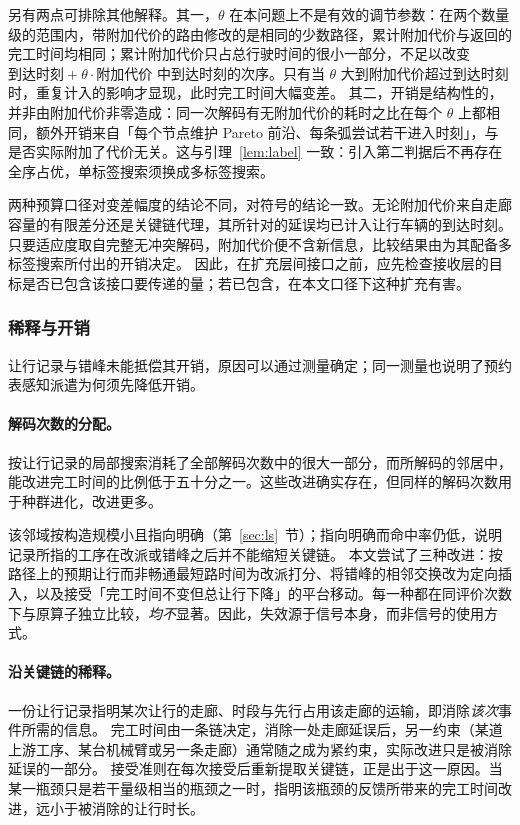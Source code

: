 \documentclass[manuscript,screen,review]{acmart}
\begin{document}
另有两点可排除其他解释。其一，$\theta$ 在本问题上不是有效的调节参数：在两个数量级的范围内，带附加代价的路由修改的是相同的少数路径，累计附加代价与返回的完工时间均相同；累计附加代价只占总行驶时间的很小一部分，不足以改变 $\text{到达时刻}+\theta\cdot\text{附加代价}$ 中到达时刻的次序。只有当 $\theta$ 大到附加代价超过到达时刻时，重复计入的影响才显现，此时完工时间大幅变差。
其二，开销是结构性的，并非由附加代价非零造成：同一次解码有无附加代价的耗时之比在每个 $\theta$ 上都相同，额外开销来自「每个节点维护 Pareto 前沿、每条弧尝试若干进入时刻」，与是否实际附加了代价无关。这与引理~\ref{lem:label} 一致：引入第二判据后不再存在全序占优，单标签搜索须换成多标签搜索。

两种预算口径对变差幅度的结论不同，对符号的结论一致。无论附加代价来自走廊容量的有限差分还是关键链代理，其所针对的延误均已计入让行车辆的到达时刻。只要适应度取自完整无冲突解码，附加代价便不含新信息，比较结果由为其配备多标签搜索所付出的开销决定。
因此，在扩充层间接口之前，应先检查接收层的目标是否已包含该接口要传递的量；若已包含，在本文口径下这种扩充有害。

\subsubsection{稀释与开销}
\label{sec:whycost}

让行记录与错峰未能抵偿其开销，原因可以通过测量确定；同一测量也说明了预约表感知派遣为何须先降低开销。

\paragraph{解码次数的分配。}
按让行记录的局部搜索消耗了全部解码次数中的很大一部分，而所解码的邻居中，能改进完工时间的比例低于五十分之一。这些改进确实存在，但同样的解码次数用于种群进化，改进更多。

该邻域按构造规模小且指向明确（第~\ref{sec:ls}~节）；指向明确而命中率仍低，说明记录所指的工序在改派或错峰之后并不能缩短关键链。
本文尝试了三种改进：按路径上的预期让行而非畅通最短路时间为改派打分、将错峰的相邻交换改为定向插入，以及接受「完工时间不变但总让行下降」的平台移动。每一种都在同评价次数下与原算子独立比较，\emph{均不}显著。因此，失效源于信号本身，而非信号的使用方式。

\paragraph{沿关键链的稀释。}
一份让行记录指明某次让行的走廊、时段与先行占用该走廊的运输，即消除\emph{该次}事件所需的信息。
完工时间由一条链决定，消除一处走廊延误后，另一约束（某道上游工序、某台机械臂或另一条走廊）通常随之成为紧约束，实际改进只是被消除延误的一部分。
接受准则在每次接受后重新提取关键链，正是出于这一原因。当某一瓶颈只是若干量级相当的瓶颈之一时，指明该瓶颈的反馈所带来的完工时间改进，远小于被消除的让行时长。
\end{document}
